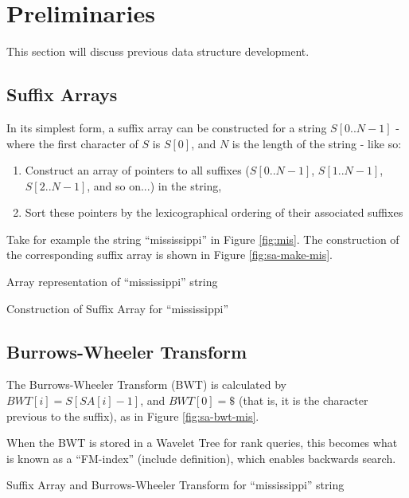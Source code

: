 \section{Preliminaries}
This section will discuss previous data structure development.


\subsection{Suffix Arrays}
In its simplest form, a suffix array can be constructed for a string
$S[0..N-1]$ - where the first character of $S$ is $S[0]$, and $N$ is the
length of the string - like so:

\begin{enumerate}
	\item
		Construct an array of pointers to all suffixes ($S[0..N-1]$, 
		$S[1..N-1]$, $S[2..N-1]$, and so on...) in the string,
	\item
		Sort these pointers by the lexicographical ordering of their associated
		suffixes
\end{enumerate}

Take for example the string ``mississippi'' in Figure \ref{fig:mis}.
The construction of the corresponding suffix array is shown in Figure
\ref{fig:sa-make-mis}.


			{Array representation of	``mississippi'' string}

			{Construction of Suffix Array for ``mississippi''}



\subsection{Burrows-Wheeler Transform}
The Burrows-Wheeler Transform (BWT) is calculated by $BWT[i] = S[SA[i]-1]$, and $BWT[0] = \$$ (that is, it is the character previous to the suffix), as in Figure \ref{fig:sa-bwt-mis}.

When the BWT is stored in a Wavelet Tree for rank queries, this becomes what is known as a ``FM-index'' (include definition), which enables backwards search.


			{Suffix Array and Burrows-Wheeler Transform for
			``mississippi'' string}


